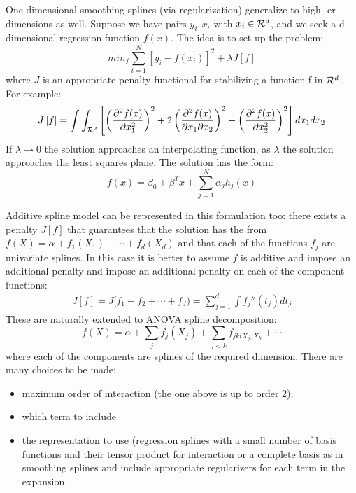 \documentclass[12pt, letterpaper]{article}
\theoremstyle{definition}
\begin{document}
One-dimensional smoothing splines (via regularization) generalize to high- er dimensions as well. Suppose we have pairs $y_i,x_i$ with $x_i \in \CMcal{R}^d$, and we seek a d-dimensional regression function $f(x)$. The idea is to set up the problem:
\begin{equation}
min_f \sum_{i=1}^N \left[y_i - f(x_i)\right]^2 +\lambda J\left[f\right]
\end{equation}
where $J$ is an appropriate penalty functional for stabilizing a function f in $\CMcal{R}^d$. For example:
\begin{equation}
 J\left[f\right] = \int \int_{\CMcal{R}^2} \left[ \left( \frac{\partial^2 f(x)}{\partial x_1^2} \right)^2+2\left(\frac{\partial^2 f(x)}{\partial x_1 \partial x_2} \right)^2+\left(\frac{\partial^2 f(x)}{\partial x_2^2} \right)^2\right]dx_1dx_2
\end{equation}
If $\lambda\rightarrow 0$ the solution approaches an interpolating function, as $\lambda$ the solution approaches the least squares plane.
The solution has the form:
\begin{equation}
f(x) = \beta_0 + \beta^T x + \sum^N_{j=1} \alpha_j h_j(x)
\end{equation}

Additive spline model can be represented in this formulation too: there exists a penalty $J[f]$ that guarantees that the solution has the from $f(X) = \alpha + f_1(X_1) +\cdots + f_d(X_d)$ and that each of the functions $f_j$ are univariate splines. In this case it is better to assume $f$ is additive and impose an additional penalty and impose an additional penalty on each of the component functions:
\begin{equation}
\begin{aligned}
J[f] = J[f_1+f_2+\cdots+f_d) =\sum_{j=1}^d \int f_j''(t_j)dt_j
\end{aligned}
\end{equation}
These are naturally extended to ANOVA spline decomposition:
\begin{equation}
f(X) = \alpha + \sum_j f_j(X_j) + \sum_{j<k} f_{jk(X_j, X_k}+ \cdots
\end{equation}
where each of the components are splines of the required dimension. There are many choices to be made:
\begin{itemize}
\item maximum order of interaction (the one above is up to order 2);
\item which term to include
\item the representation to use (regression splines with a small number of basis functions and their tensor product for interaction or a complete basis as in smoothing splines and include appropriate regularizers for each term in the expansion.
\end{itemize}
\end{document}
